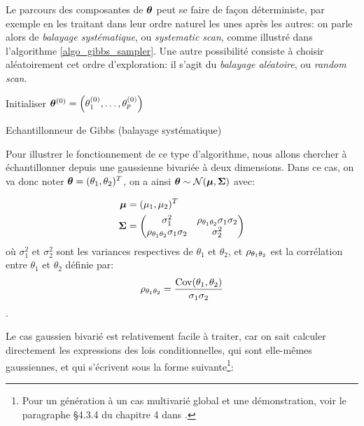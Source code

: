 Le parcours des composantes de ${\bm{\theta}}$ peut se faire de façon déterministe, par exemple en les traitant dans leur ordre naturel les unes après les autres: on parle alors de \textit{balayage systématique}, ou \textit{systematic scan}, comme illustré dans l'algorithme \ref{algo_gibbs_sampler}. Une autre possibilité consiste à choisir aléatoirement cet ordre d'exploration: il s'agit du \textit{balayage aléatoire}, ou \textit{random scan}. \\

\IncMargin{1em}
\begin{algorithm}
	\SetAlgoLined
	Initialiser ${\bm{\theta}}^{(0)} = \left(\theta_1^{(0)}, \dots, \theta_p^{(0)}\right)$\;
	\caption{Echantillonneur de Gibbs (balayage systématique)}
	\label{algo_gibbs_sampler}
\end{algorithm}

Pour illustrer le fonctionnement de ce type d'algorithme, nous allons chercher à échantillonner depuis une gaussienne bivariée à deux dimensions. Dans ce cas, on va donc noter ${\bm{\theta}} = (\theta_1, \theta_2)^T$, on a ainsi ${\bm{\theta}} \sim \mathcal{N}({\bm{\mu}}, {\bm{\Sigma}})$ avec: 

\begin{equation}
\label{eq_caracs_gaussienne_bivariee}
\begin{split}
{\bm{\mu}} &= (\mu_1, \mu_2)^T \\
{\bm{\Sigma}} &= \begin{pmatrix}
\sigma_{1}^2 & {\rho}_{\theta_1\theta_2} \sigma_1 \sigma_2 \\
 {\rho}_{\theta_1\theta_2} \sigma_1 \sigma_2 & \sigma_{2}^2 
\end{pmatrix}
\end{split}
\end{equation} 
où $\sigma_1^2$ et $\sigma_2^2$ sont les variances respectives de $\theta_1$ et $\theta_2$, et ${\rho}_{\theta_1\theta_2}$ est la corrélation entre $\theta_1$ et $\theta_2$ définie par: $${\rho}_{\theta_1\theta_2} = \dfrac{\text{Cov}(\theta_1,\theta_2)}{\sigma_1\sigma_2}$$.

Le cas gaussien bivarié est relativement facile à traiter, car on sait calculer directement les expressions des lois conditionnelles, qui sont elle-mêmes gaussiennes, et qui s'écrivent sous la forme suivante\footnote{Pour un génération à un cas multivarié global et une démonstration, voir le paragraphe §4.3.4 du chapitre 4 dans \cite{Murphy2012}.}:

